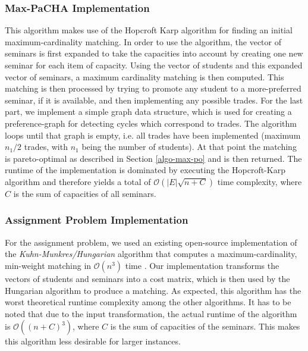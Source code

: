 \subsubsection{Max-PaCHA Implementation}\label{impl:maxpo}
This algorithm makes use of the Hopcroft Karp algorithm for finding an initial maximum-cardinality matching. In order to use the algorithm, the vector of seminars is first expanded to take the capacities into account by creating one new seminar for each item of capacity. Using the vector of students and this expanded vector of seminars, a maximum cardinality matching is then computed. This matching is then processed by trying to promote any student to a more-preferred seminar, if it is available, and then implementing any possible trades. For the last part, we implement a simple graph data structure, which is used for creating a preference-graph for detecting cycles which correspond to trades. The algorithm loops until that graph is empty, i.e. all trades have been implemented (maximum $n_1/2$ trades, with $n_1$ being the number of students). At that point the matching is pareto-optimal as described in Section \ref{algo-max-po} and is then returned. The runtime of the implementation is dominated by executing the Hopcroft-Karp algorithm and therefore yields a total of $\mathcal{O}(|E|\sqrt{n+C})$ time complexity, where $C$ is the sum of capacities of all seminars.

\subsubsection{Assignment Problem Implementation}
For the assignment problem, we used an existing open-source implementation of the \emph{Kuhn-Munkres/Hungarian} algorithm that computes a maximum-cardinality, min-weight matching in $\mathcal{O}(n^3)$ time \cite{HungarianGithub}. Our implementation transforms the vectors of students and seminars into a cost matrix, which is then used by the Hungarian algorithm to produce a matching. As expected, this algorithm has the worst theoretical runtime complexity among the other algorithms. It has to be noted that due to the input transformation, the actual runtime of the algorithm is $\mathcal{O}((n + C)^3)$, where $C$ is the sum of capacities of the seminars. This makes this algorithm less desirable for larger instances.

